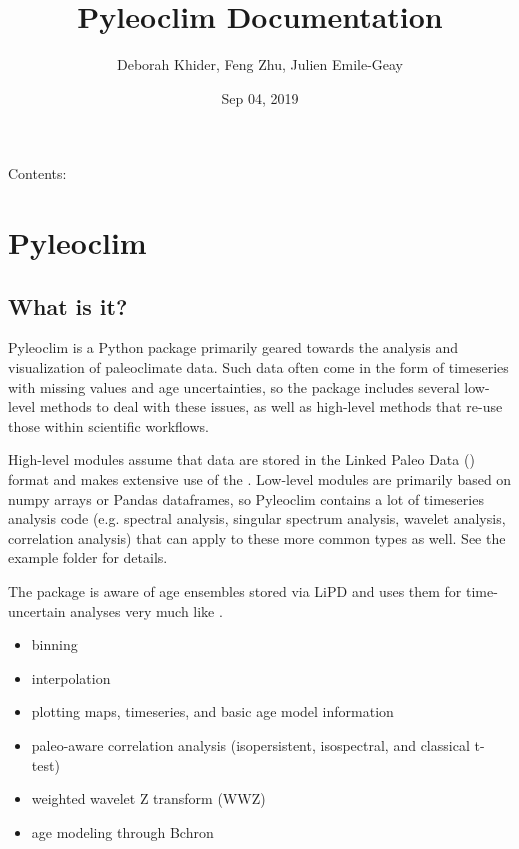 \documentclass[letterpaper,10pt,english]{sphinxmanual}
\title{Pyleoclim Documentation}
\date{Sep 04, 2019}
\author{Deborah Khider, Feng Zhu, Julien Emile-Geay}
\begin{document}
\pagestyle{empty}
\sphinxmaketitle
\pagestyle{plain}
\sphinxtableofcontents
\pagestyle{normal}
\label{\detokenize{index::doc}}


Contents:


\chapter{Pyleoclim}
\label{\detokenize{Introduction:pyleoclim}}\label{\detokenize{Introduction::doc}}

\section{What is it?}
\label{\detokenize{Introduction:what-is-it}}
Pyleoclim is a Python package primarily geared towards the analysis and visualization of paleoclimate data.
Such data often come in the form of timeseries with missing values and age uncertainties,
so the package includes several low-level methods to deal with these issues,
as well as high-level methods that re-use those within scientific workflows.

High-level modules assume that data are stored in the Linked Paleo Data () format
and makes extensive use of the . Low-level modules are primarily
based on numpy arrays or Pandas dataframes, so Pyleoclim contains a lot of
timeseries analysis code (e.g. spectral analysis, singular spectrum analysis,
wavelet analysis, correlation analysis) that can apply to these more common types
as well. See the example folder for details.

The package is aware of age ensembles stored via LiPD and uses them for time-uncertain analyses very much like .

\begin{itemize}
\item {} 
binning

\item {} 
interpolation

\item {} 
plotting maps, timeseries, and basic age model information

\item {} 
paleo-aware correlation analysis (isopersistent, isospectral, and classical t-test)

\item {} 
weighted wavelet Z transform (WWZ)

\item {} 
age modeling through Bchron

\end{itemize}
\end{document}
